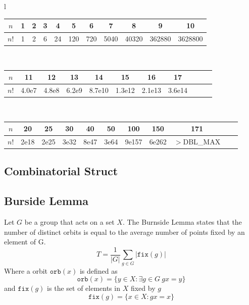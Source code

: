 		\begin{center}
			\begin{tabular}{l}
				\begin{tabular}{c|c@{\ }c@{\ }c@{\ }c@{\ }c@{\ }c@{\ }c@{\ }c@{\ }c@{\ }c}
				$n$  & 1 & 2 & 3 & 4  & 5   & 6   & 7    & 8     & 9      & 10\\
				\hline
				$n!$ & 1 & 2 & 6 & 24 & 120 & 720 & 5040 & 40320 & 362880 & 3628800\\
				\end{tabular}\\
				\begin{tabular}{c|c@{\ }c@{\ }c@{\ }c@{\ }c@{\ }c@{\ }c@{\ }c@{\ }c@{\ }c}
				$n$  & 11    & 12    & 13    & 14     & 15     & 16     & 17\\
				\hline
				$n!$ & 4.0e7 & 4.8e8 & 6.2e9 & 8.7e10 & 1.3e12 & 2.1e13 & 3.6e14\\
				\end{tabular}\\
				\begin{tabular}{c|c@{\ }c@{\ }c@{\ }c@{\ }c@{\ }c@{\ }c@{\ }c@{\ }c@{\ }c}
				$n$  & 20   & 25   & 30   & 40   & 50   & 100   & 150   & 171\\
				\hline
				$n!$ & 2e18 & 2e25 & 3e32 & 8e47 & 3e64 & 9e157 & 6e262 & \scriptsize{$>$DBL\_MAX}\\
				\end{tabular}
			\end{tabular}
		\end{center}

	\subsection{Combinatorial Struct}


	\subsection{Burside Lemma}

	Let $G$ be a group that acts on a set $X$. The Burnside Lemma states that the number of distinct orbits is equal to the average number of points fixed by an element of G.
    $$T = \frac{1}{|G|} \sum_{g \in G} |\texttt{fix}(g)|$$
    Where a orbit $\texttt{orb}(x)$ is defined as
    $$\texttt{orb}(x) = \{y \in X : \exists g \in G \ gx = y \}$$
    and $\texttt{fix}(g)$ is the set of elements in $X$ fixed by $g$
    $$\texttt{fix}(g) = \{x \in X : gx = x\}$$
    

